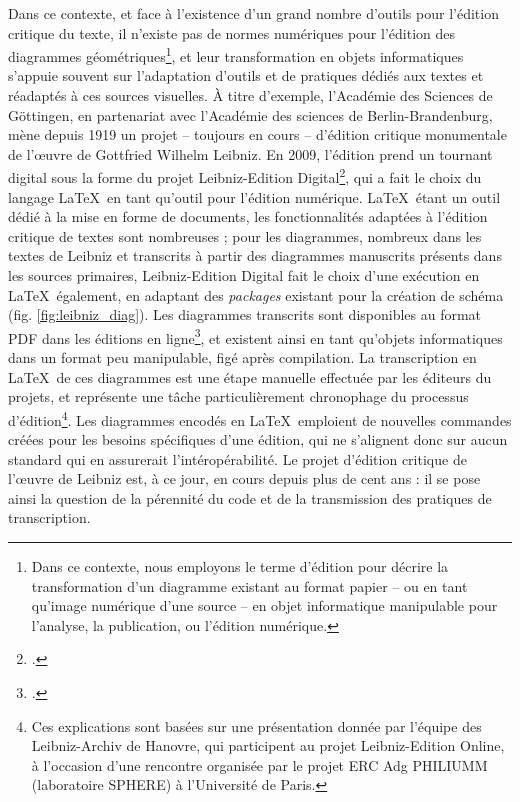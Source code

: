 	Dans ce contexte, et face à l'existence d'un grand nombre d'outils pour l'édition critique du texte, il n'existe pas de normes numériques pour l'édition des diagrammes géométriques\footnote{Dans ce contexte, nous employons le terme d'édition pour décrire la transformation d'un diagramme existant au format papier -- ou en tant qu'image numérique d'une source -- en objet informatique manipulable pour l'analyse, la publication, ou l'édition numérique.}, et leur transformation en objets informatiques s'appuie souvent sur l'adaptation d'outils et de pratiques dédiés aux textes et réadaptés à ces sources visuelles. À titre d'exemple, l'Académie des Sciences de Göttingen, en partenariat avec l'Académie des sciences de Berlin-Brandenburg, mène depuis 1919 un projet -- toujours en cours -- d'édition critique monumentale de l'œuvre de Gottfried Wilhelm Leibniz. En 2009, l'édition prend un tournant digital sous la forme du projet Leibniz-Edition Digital\footcite{LeibnizEditionDigital}, qui a fait le choix du langage \LaTeX\ en tant qu'outil pour l'édition numérique. \LaTeX\ étant un outil dédié à la mise en forme de documents, les fonctionnalités adaptées à l'édition critique de textes sont nombreuses ; pour les diagrammes, nombreux dans les textes de Leibniz et transcrits à partir des diagrammes manuscrits présents dans les sources primaires, Leibniz-Edition Digital fait le choix d'une exécution en \LaTeX\ également, en adaptant des \textit{packages} existant pour la création de schéma (fig. \ref{fig:leibniz_diag}). Les diagrammes transcrits sont disponibles au format PDF dans les éditions en ligne\footcite{hannoverVorauseditionZurLeibnizAkademieAusgabe2022}, et existent ainsi en tant qu'objets informatiques dans un format peu manipulable, figé après compilation. La transcription en \LaTeX\ de ces diagrammes est une étape manuelle effectuée par les éditeurs du projets, et représente une tâche particulièrement chronophage du processus d'édition\footnote{Ces explications sont basées sur une présentation donnée par l'équipe des Leibniz-Archiv de Hanovre, qui participent au projet Leibniz-Edition Online, à l'occasion d'une rencontre organisée par le projet ERC Adg PHILIUMM (laboratoire SPHERE) à l'Université de Paris.}. Les diagrammes encodés en \LaTeX\ emploient de nouvelles commandes créées pour les besoins spécifiques d'une édition, qui ne s'alignent donc sur aucun standard qui en assurerait l'intéropérabilité. Le projet d'édition critique de l'œuvre de Leibniz est, à ce jour, en cours depuis plus de cent ans : il se pose ainsi la question de la pérennité du code et de la transmission des pratiques de transcription. 
	
